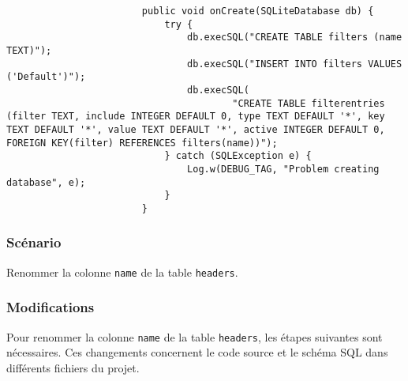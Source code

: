 \begin{enumerate}
\begin{itemize}
\begin{verbatim}
                        public void onCreate(SQLiteDatabase db) {
                            try {
                                db.execSQL("CREATE TABLE filters (name TEXT)");
                                db.execSQL("INSERT INTO filters VALUES ('Default')");
                                db.execSQL(
                                        "CREATE TABLE filterentries (filter TEXT, include INTEGER DEFAULT 0, type TEXT DEFAULT '*', key TEXT DEFAULT '*', value TEXT DEFAULT '*', active INTEGER DEFAULT 0, FOREIGN KEY(filter) REFERENCES filters(name))");
                            } catch (SQLException e) {
                                Log.w(DEBUG_TAG, "Problem creating database", e);
                            }
                        }
                    \end{verbatim}
          \end{itemize}
\end{enumerate}

\subsubsection{Scénario}
Renommer la colonne \texttt{name} de la table \texttt{headers}.
\subsubsection{Modifications}
Pour renommer la colonne \texttt{name} de la table \texttt{headers}, les étapes suivantes sont nécessaires. Ces changements concernent le code source et le schéma SQL dans différents fichiers du projet.

